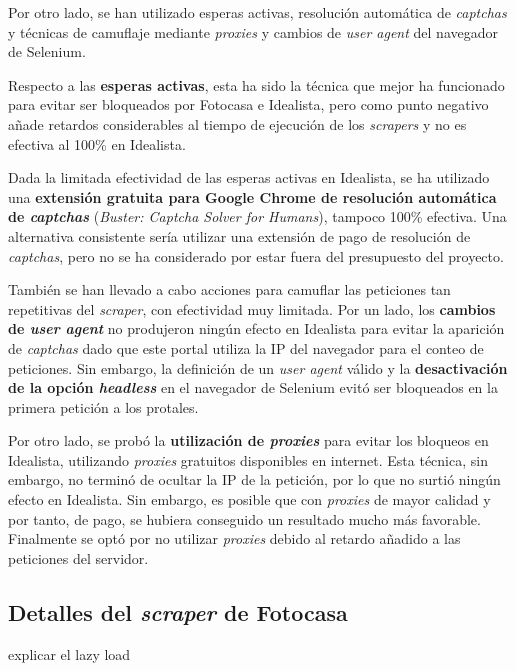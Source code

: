 \documentclass[12pt]{article}
\begin{document}
Por otro lado, se han utilizado esperas activas, resolución automática de \textit{captchas} y técnicas de camuflaje mediante \textit{proxies} y cambios de \textit{user agent} del navegador de Selenium.

\newpage
Respecto a las \textbf{esperas activas}, esta ha sido la técnica que mejor ha funcionado para evitar ser bloqueados por Fotocasa e Idealista, pero como punto negativo añade retardos considerables al tiempo de ejecución de los \textit{scrapers} y no es efectiva al 100\% en Idealista.

Dada la limitada efectividad de las esperas activas en Idealista, se ha utilizado una \textbf{extensión gratuita para Google Chrome de resolución automática de \textit{captchas}} (\textit{Buster: Captcha Solver for Humans}), tampoco 100\% efectiva. Una alternativa consistente sería utilizar una extensión de pago de resolución de \textit{captchas}, pero no se ha considerado por estar fuera del presupuesto del proyecto.

También se han llevado a cabo acciones para camuflar las peticiones tan repetitivas del \textit{scraper}, con efectividad muy limitada. Por un lado, los \textbf{cambios de \textit{user agent}} no produjeron ningún efecto en Idealista para evitar la aparición de \textit{captchas} dado que este portal utiliza la IP del navegador para el conteo de peticiones. Sin embargo, la definición de un \textit{user agent} válido y la \textbf{desactivación de la opción \textit{headless}} en el navegador de Selenium evitó ser bloqueados en la primera petición a los protales.

Por otro lado, se probó la \textbf{utilización de \textit{proxies}} para evitar los bloqueos en Idealista, utilizando \textit{proxies} gratuitos disponibles en internet. Esta técnica, sin embargo, no terminó de ocultar la IP de la petición, por lo que no surtió ningún efecto en Idealista. Sin embargo, es posible que con \textit{proxies} de mayor calidad y por tanto, de pago, se hubiera conseguido un resultado mucho más favorable. Finalmente se optó por no utilizar \textit{proxies} debido al retardo añadido a las peticiones del servidor.

\vspace{-1.5em}\subsection*{Detalles del \textit{scraper} de Fotocasa}\vspace{-1em}

explicar el lazy load
\end{document}
